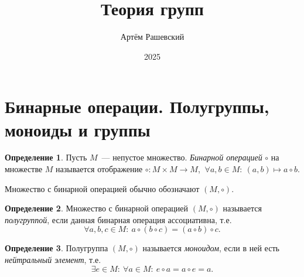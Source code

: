 \documentclass[a4paper, 14pt]{extarticle}
\title{Теория групп}
\author{Артём Рашевский}
\date{2025}
\newcommand{\suchthat}{{:}{ } \ }
\theoremstyle{definition}
\newtheorem{definition}{Определение}
\theoremstyle{plain}
\numberwithin{theorem}{section}
\numberwithin{definition}{section}
\numberwithin{statement}{section}
\numberwithin{lemma}{section}
\numberwithin{consequence}{section}
\begin{document}
	
	\maketitle
	\thispagestyle{empty}
	\newpage
	\tableofcontents
	\newpage
	\section{Бинарные операции. Полугруппы, моноиды и группы}
	\begin{definition}
		Пусть $M$~--- непустое множество. \textit{Бинарной операцией} $\circ$ на множестве $M$ называется отображение 
		${\circ : M \times M \rightarrow M}$, ${\ \forall a,b \in M\suchthat (a, b) \mapsto a \circ b}$.
	\end{definition}
	
	Множество с бинарной операцией обычно обозначают $(M, \circ).$
	
	\begin{definition}
		Множество с бинарной операцией $(M, \circ)$ называется \textit{полугруппой}, если данная бинарная операция
		ассоциативна, т.е.
		\begin{equation*}
			\forall a, b, c \in M\suchthat a \circ (b \circ c) = (a \circ b) \circ c.
		\end{equation*}
	\end{definition}
	
	\begin{definition}
		Полугруппа $(M, \circ)$ называется \textit{моноидом}, если в ней есть \textit{нейтральный элемент}, т.е.
		\begin{equation*}
			\exists e \in M \suchthat \forall a \in M\suchthat e \circ a = a \circ e = a.
		\end{equation*}
	\end{definition}
	
\end{document}
